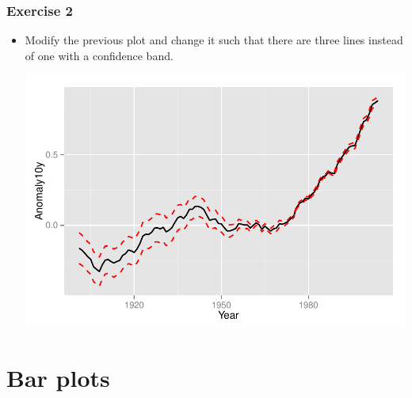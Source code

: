 \documentclass{beamer}\usepackage[]{graphicx}\usepackage[]{color}
\newenvironment{knitrout}{}{} %
\begin{document}
\begin{frame}[fragile]
\frametitle{Exercise 2}
\begin{itemize}
\item Modify the previous plot and change it such that there are three lines instead of one with a confidence band.
\begin{knitrout}\footnotesize
{}\color{fgcolor}

{\centering \includegraphics[width=.75\linewidth]{figure/ex2} 

}



\end{knitrout}

\end{itemize}
\end{frame}


\section*{Bar plots}
\frame{\sectionpage}

\end{document}

